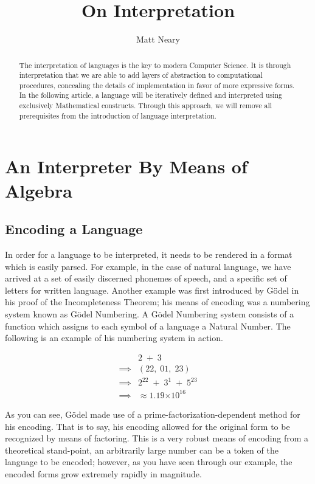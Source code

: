 \documentclass{article}
\providecommand{\e}[1]{\ensuremath{\times 10^{#1}}}
\begin{document}
\begin{titlepage}
\title{On Interpretation}
\author{Matt Neary}
\maketitle
\begin{abstract}
The interpretation of languages is the key to modern Computer Science. It is through interpretation
that we are able to add layers of abstraction to computational procedures, concealing the details of
implementation in favor of more expressive forms. In the following article, a language will be 
iteratively defined and interpreted using exclusively Mathematical constructs. Through this approach,
we will remove all prerequisites from the introduction of language interpretation.
\end{abstract}
\thispagestyle{empty}
\end{titlepage}

\section{An Interpreter By Means of Algebra}
\subsection{Encoding a Language}
In order for a language to be interpreted, it needs to be rendered in a format which is easily
parsed. For example, in the case of natural language, we have arrived at a set of easily discerned
phonemes of speech, and a specific set of letters for written language. Another example was first
introduced by G\"odel in his proof of the Incompleteness Theorem; his means of encoding was a
numbering system known as G\"odel Numbering. A G\"odel Numbering system consists of a function
which assigns to each symbol of a language a Natural Number. The following is an example of his 
numbering system in action.

\begin{align*}
    &2 \; + \; 3
\\ \implies &(22, \; 01, \; 23)
\\ \implies &2^{22} \; + \; 3^{1} \; + \; 5^{23}
\\ \implies &\approx 1.19\e{16}
\end{align*}

As you can see, G\"odel made use of a prime-factorization-dependent method for his encoding. That is
to say, his encoding allowed for the original form to be recognized by means of factoring. This is a
very robust means of encoding from a theoretical stand-point, an arbitrarily large number can be a
token of the language to be encoded; however, as you have seen through our example, the encoded forms
grow extremely rapidly in magnitude.
\end{document}
